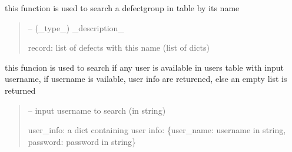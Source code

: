 \documentclass[letterpaper,10pt,english]{sphinxmanual}
\begin{document}
\begin{savenotes}
\begin{fulllineitems}
\begin{savenotes}\begin{fulllineitems}
\label{\detokenize{setting/database_utils:oxin.database_utils.dataBaseUtils.search_defect_group_by_name}}
\pysigstartsignatures
{}
\pysigstopsignatures
\sphinxAtStartPar
this function is used to search a defect\sphinxhyphen{}group in table by its name
\begin{quote}\begin{description}
\sphinxAtStartPar
{} – (\_type\_) \_description\_

\sphinxAtStartPar
record: list of defects with this name (list of dicts)

\end{description}\end{quote}

\end{fulllineitems}\end{savenotes}


\begin{savenotes}\begin{fulllineitems}
\label{\detokenize{setting/database_utils:oxin.database_utils.dataBaseUtils.search_user}}
\pysigstartsignatures
{}
\pysigstopsignatures
\sphinxAtStartPar
this funcion is used to search if any user is available in users table with input username,
if username is vailable, user info are returened,
else an empty list is returned
\begin{quote}\begin{description}
\sphinxAtStartPar
{} – input username to search (in string)

\sphinxAtStartPar
user\_info: a dict containing user info:
\{user\_name: username in string, password: password in string\}

\end{description}\end{quote}


\end{fulllineitems}
\end{savenotes}
\end{fulllineitems}
\end{savenotes}
\end{document}
